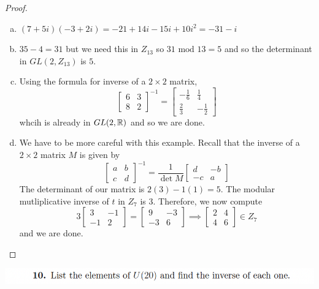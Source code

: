 \documentclass[12pt]{scrartcl}
\begin{document}
\begin{proof}
  \hfill

  \begin{enumerate}[a.]
    \item $(7 + 5i)(-3 + 2i) = -21 + 14i - 15i + 10i^2 = -31 - i$
    \item $35 - 4 = 31$ but we need this in $Z_{13}$ so $31 \text{ mod } 13 = 5$ and so
    the determinant in $GL(2, Z_{13})$ is $5$.
    \item Using the formula for inverse of a $2\times 2$ matrix, 
    \[\begin{bmatrix}
      6 & 3\\ 8 & 2
    \end{bmatrix}^{-1} = \begin{bmatrix}
      -\frac{1}{6} & \frac{1}{4}\\
      \frac{2}{3} & -\frac{1}{2}
    \end{bmatrix}\]
    whcih is already in $GL(2, \mathbb R)$ and so we are done.
    \item We have to be more careful with this example. Recall that the inverse of a $2 \times 2$ matrix $M$ is 
    given by 
    \[\begin{bmatrix}
      a & b\\ c & d
    \end{bmatrix}^{-1} = \frac{1}{\det M} \begin{bmatrix}
      d & -b \\ -c & a
    \end{bmatrix}\]
    The determinant of our matrix is $2(3) - 1(1) = 5$. The modular mutliplicative inverse of $t$ in 
    $Z_7$ is $3$. Therefore, we now compute 
    \[3 \begin{bmatrix}
      3 & -1\\ -1 & 2
    \end{bmatrix} = \begin{bmatrix}
      9 & -3\\
      -3 & 6
    \end{bmatrix} \implies \begin{bmatrix}
      2 & 4\\ 4 & 6
    \end{bmatrix} \in Z_7\]
    and we are done.
  \end{enumerate}
\end{proof}

\newpage 

\includegraphics[width=14cm]{10.png}
\end{document}
